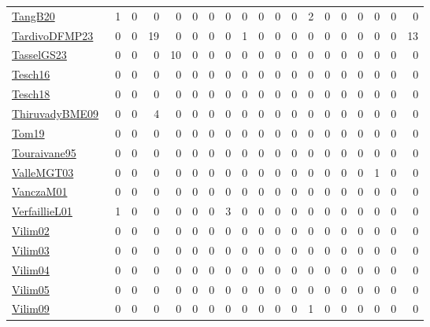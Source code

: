 {\begin{longtable}{l*{18}{r}}
\href{papers/TangB20.pdf}{TangB20}~\cite{TangB20} & 1 & 0 & 0 & 0 & 0 & 0 & 0 & 0 & 0 & 0 & 0 & 2 & 0 & 0 & 0 & 0 & 0 & 0\\
\href{papers/TardivoDFMP23.pdf}{TardivoDFMP23}~\cite{TardivoDFMP23} & 0 & 0 & 19 & 0 & 0 & 0 & 0 & 1 & 0 & 0 & 0 & 0 & 0 & 0 & 0 & 0 & 0 & 13\\
\href{papers/TasselGS23.pdf}{TasselGS23}~\cite{TasselGS23} & 0 & 0 & 0 & 10 & 0 & 0 & 0 & 0 & 0 & 0 & 0 & 0 & 0 & 0 & 0 & 0 & 0 & 0\\
\href{papers/Tesch16.pdf}{Tesch16}~\cite{Tesch16} & 0 & 0 & 0 & 0 & 0 & 0 & 0 & 0 & 0 & 0 & 0 & 0 & 0 & 0 & 0 & 0 & 0 & 0\\
\href{papers/Tesch18.pdf}{Tesch18}~\cite{Tesch18} & 0 & 0 & 0 & 0 & 0 & 0 & 0 & 0 & 0 & 0 & 0 & 0 & 0 & 0 & 0 & 0 & 0 & 0\\
\href{papers/ThiruvadyBME09.pdf}{ThiruvadyBME09}~\cite{ThiruvadyBME09} & 0 & 0 & 4 & 0 & 0 & 0 & 0 & 0 & 0 & 0 & 0 & 0 & 0 & 0 & 0 & 0 & 0 & 0\\
\href{papers/Tom19.pdf}{Tom19}~\cite{Tom19} & 0 & 0 & 0 & 0 & 0 & 0 & 0 & 0 & 0 & 0 & 0 & 0 & 0 & 0 & 0 & 0 & 0 & 0\\
\href{papers/Touraivane95.pdf}{Touraivane95}~\cite{Touraivane95} & 0 & 0 & 0 & 0 & 0 & 0 & 0 & 0 & 0 & 0 & 0 & 0 & 0 & 0 & 0 & 0 & 0 & 0\\
\href{papers/ValleMGT03.pdf}{ValleMGT03}~\cite{ValleMGT03} & 0 & 0 & 0 & 0 & 0 & 0 & 0 & 0 & 0 & 0 & 0 & 0 & 0 & 0 & 0 & 1 & 0 & 0\\
\href{papers/VanczaM01.pdf}{VanczaM01}~\cite{VanczaM01} & 0 & 0 & 0 & 0 & 0 & 0 & 0 & 0 & 0 & 0 & 0 & 0 & 0 & 0 & 0 & 0 & 0 & 0\\
\href{papers/VerfaillieL01.pdf}{VerfaillieL01}~\cite{VerfaillieL01} & 1 & 0 & 0 & 0 & 0 & 0 & 3 & 0 & 0 & 0 & 0 & 0 & 0 & 0 & 0 & 0 & 0 & 0\\
\href{papers/Vilim02.pdf}{Vilim02}~\cite{Vilim02} & 0 & 0 & 0 & 0 & 0 & 0 & 0 & 0 & 0 & 0 & 0 & 0 & 0 & 0 & 0 & 0 & 0 & 0\\
\href{papers/Vilim03.pdf}{Vilim03}~\cite{Vilim03} & 0 & 0 & 0 & 0 & 0 & 0 & 0 & 0 & 0 & 0 & 0 & 0 & 0 & 0 & 0 & 0 & 0 & 0\\
\href{papers/Vilim04.pdf}{Vilim04}~\cite{Vilim04} & 0 & 0 & 0 & 0 & 0 & 0 & 0 & 0 & 0 & 0 & 0 & 0 & 0 & 0 & 0 & 0 & 0 & 0\\
\href{papers/Vilim05.pdf}{Vilim05}~\cite{Vilim05} & 0 & 0 & 0 & 0 & 0 & 0 & 0 & 0 & 0 & 0 & 0 & 0 & 0 & 0 & 0 & 0 & 0 & 0\\
\href{papers/Vilim09.pdf}{Vilim09}~\cite{Vilim09} & 0 & 0 & 0 & 0 & 0 & 0 & 0 & 0 & 0 & 0 & 0 & 1 & 0 & 0 & 0 & 0 & 0 & 0\\

\end{longtable}}
